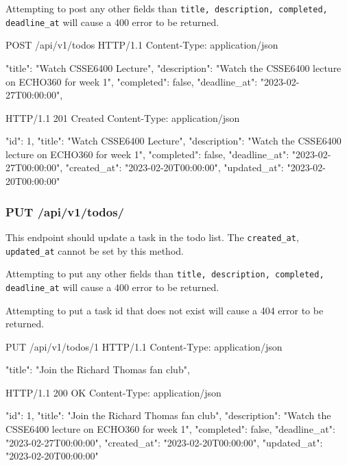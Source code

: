 \documentclass{csse4400}
\begin{document}
Attempting to post any other fields than \texttt{title, description, completed, deadline\_at} will cause a 400 error to be returned.


\begin{code}[language=json,numbers=none]{}
POST /api/v1/todos HTTP/1.1
Content-Type: application/json

{
    "title": "Watch CSSE6400 Lecture",
    "description": "Watch the CSSE6400 lecture on ECHO360 for week 1",
    "completed": false,
    "deadline_at": "2023-02-27T00:00:00",
}
\end{code}
\begin{code}[language=json,numbers=none]{}
HTTP/1.1 201 Created
Content-Type: application/json

{
    "id": 1,
    "title": "Watch CSSE6400 Lecture",
    "description": "Watch the CSSE6400 lecture on ECHO360 for week 1",
    "completed": false,
    "deadline_at": "2023-02-27T00:00:00",
    "created_at": "2023-02-20T00:00:00",
    "updated_at": "2023-02-20T00:00:00"
}
\end{code}

\subsubsection{PUT /api/v1/todos/}
This endpoint should update a task in the todo list. The \texttt{created\_at}, \texttt{updated\_at} cannot be set by this method.

Attempting to put any other fields than \texttt{title, description, completed, deadline\_at} will cause a 400 error to be returned.

Attempting to put a task id that does not exist will cause a 404 error to be returned.

\begin{code}[language=json,numbers=none]{}
PUT /api/v1/todos/1 HTTP/1.1
Content-Type: application/json

{
    "title": "Join the Richard Thomas fan club",
}
\end{code}

\begin{code}[language=json,numbers=none]{}
HTTP/1.1 200 OK
Content-Type: application/json

{
    "id": 1,
    "title": "Join the Richard Thomas fan club",
    "description": "Watch the CSSE6400 lecture on ECHO360 for week 1",
    "completed": false,
    "deadline_at": "2023-02-27T00:00:00",
    "created_at": "2023-02-20T00:00:00",
    "updated_at": "2023-02-20T00:00:00"
}
\end{code}
\end{document}

